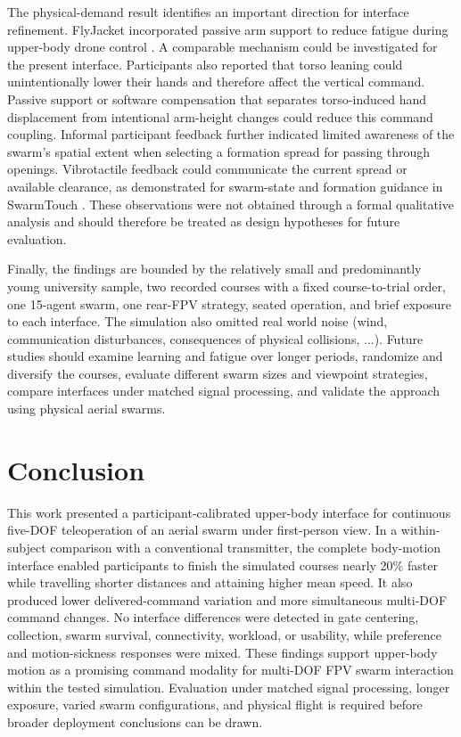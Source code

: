 \documentclass[conference, a4paper]{IEEEtran}
\begin{document}
The physical-demand result identifies an important direction for interface
refinement. FlyJacket incorporated passive arm support to reduce fatigue during
upper-body drone control \cite{rognon2018flyjacket}. A comparable mechanism
could be investigated for the present interface. Participants also reported
that torso leaning could unintentionally lower their hands and therefore
affect the vertical command. Passive support or software compensation that
separates torso-induced hand displacement from intentional arm-height changes
could reduce this command coupling. Informal participant feedback further
indicated limited awareness of the swarm's spatial extent when selecting a
formation spread for passing through openings. Vibrotactile feedback could
communicate the current spread or available clearance, as demonstrated for
swarm-state and formation guidance in SwarmTouch
\cite{tsykunov2019swarmtouch}. These observations were not obtained through a
formal qualitative analysis and should therefore be treated as design
hypotheses for future evaluation.

Finally, the findings are bounded by the relatively small and predominantly
young university sample, two recorded courses with a fixed course-to-trial
order, one 15-agent swarm, one rear-FPV strategy, seated operation, and brief
exposure to each interface. The simulation also omitted real world noise (wind, communication
disturbances, consequences of physical collisions, ...). Future studies should examine learning and fatigue over longer periods, randomize and diversify the courses, evaluate different swarm
sizes and viewpoint strategies, compare interfaces under matched signal
processing, and validate the approach using physical aerial swarms.

\section{Conclusion}

This work presented a participant-calibrated upper-body interface for
continuous five-DOF teleoperation of an aerial swarm under first-person view.
In a within-subject comparison with a conventional transmitter, the complete
body-motion interface enabled participants to finish the simulated courses
nearly 20\% faster while travelling shorter distances and attaining higher mean
speed. It also produced lower delivered-command variation and more
simultaneous multi-DOF command changes. No interface differences were detected
in gate centering, collection, swarm survival, connectivity, workload, or
usability, while preference and motion-sickness responses were mixed. These
findings support upper-body motion as a promising command modality for
multi-DOF FPV swarm interaction within the tested simulation. Evaluation under
matched signal processing, longer exposure, varied swarm configurations, and
physical flight is required before broader deployment conclusions can be
drawn.




\end{document}

